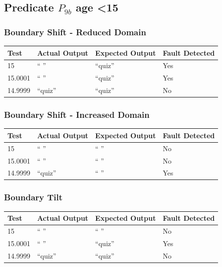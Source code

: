 \documentclass[11pt, oneside]{article}   	%
\begin{document}
\subsection{Predicate $P_{9b}$ age \textless 15}
\subsubsection{Boundary Shift - Reduced Domain}
\begin{table}[!htb]
\centering
\begin{tabular}{|l|l|l|l|}
\hline
Test    & Actual Output & Expected Output & Fault Detected \\ \hline
15      & “ ”           & “quiz”          & Yes            \\ \hline
15.0001 & “ ”           & “quiz”          & Yes            \\ \hline
14.9999 & “quiz”        & “quiz”          & No             \\ \hline
\end{tabular}
\end{table}

\subsubsection{Boundary Shift - Increased Domain}
\begin{table}[!htb]
\centering
\begin{tabular}{|l|l|l|l|}
\hline
Test    & Actual Output & Expected Output & Fault Detected \\ \hline
15      & “ ”           & “ ”             & No             \\ \hline
15.0001 & “ ”           & “ ”             & No             \\ \hline
14.9999 & “quiz”        & “ ”             & Yes            \\ \hline
\end{tabular}
\end{table}

\subsubsection{Boundary Tilt}
\begin{table}[!htb]
\centering
\begin{tabular}{|l|l|l|l|}
\hline
Test    & Actual Output & Expected Output & Fault Detected \\ \hline
15      & “ ”           & “ ”             & No             \\ \hline
15.0001 & “ ”           & “quiz”          & Yes            \\ \hline
14.9999 & “quiz”        & “quiz”          & No             \\ \hline
\end{tabular}
\end{table}
\end{document}
